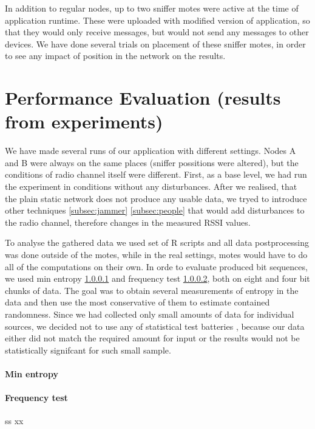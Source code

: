 \documentclass[
  print, %
  table,   %
  nolof,     %
  nolot,     %
           oneside
]{fithesis3}
\begin{document}
  In addition to regular nodes, up to two sniffer motes were active at the time of application runtime. These were uploaded with modified version of application, so that they would only receive messages, but would not send any messages to other devices. We have done several trials on placement of these sniffer motes, in order to see any impact of position in the network on the results.



  \section{Performance Evaluation (results from experiments)}\label{sec:results}
  We have made several runs of our application with different settings. Nodes A and B were always on the same places (sniffer possitions were altered), but the conditions of radio channel itself were different. First, as a base level, we had run the experiment in conditions without any disturbances. After we realised, that the plain static network does not produce any usable data, we tryed to introduce other techniques \ref{subsec:jammer} \ref{subsec:people} that would add disturbances to the radio channel, therefore changes in the measured RSSI values.

  To analyse the gathered data we used set of R scripts %
  and all data postprocessing was done outside of the motes, while in the real settings, motes would have to do all of the computations on their own. In orde to evaluate produced bit sequences, we used min entropy \ref{par:min} and frequency test \ref{par:freq}, both on eight and four bit chunks of data. The goal was to obtain several measurements of entropy in the data and then use the most conservative of them to estimate contained randomness. Since we had collected only small amounts of data for individual sources, we decided not to use any of statistical test batteries %
  , because our data either did not match the required amount for input or the results would not be statistically signifcant for such small sample.

  \paragraph{Min entropy}\label{par:min}

  \paragraph{Frequency test}\label{par:freq} ss
xx
\end{document}

